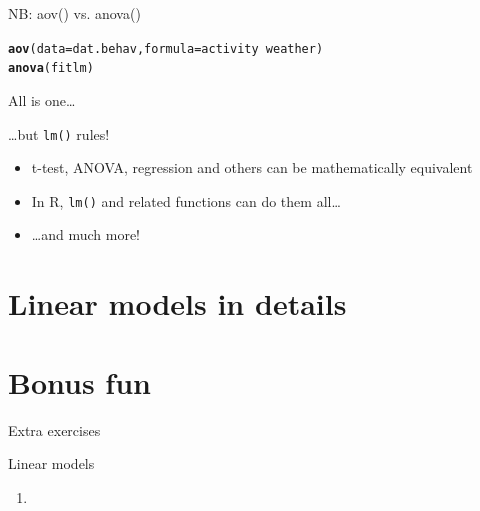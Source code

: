 \documentclass[10pt]{beamer}\usepackage[]{graphicx}\usepackage[]{color}
\makeatletter
\newcommand{\hlopt}[1]{\textcolor[rgb]{0,0,0}{#1}}%
\newcommand{\hlstd}[1]{\textcolor[rgb]{0.345,0.345,0.345}{#1}}%
\newcommand{\hlkwc}[1]{\textcolor[rgb]{0.333,0.667,0.333}{#1}}%
\newcommand{\hlkwd}[1]{\textcolor[rgb]{0.737,0.353,0.396}{\textbf{#1}}}%
\newenvironment{kframe}{%
 \def\at@end@of@kframe{}%
 \ifinner\ifhmode%
  \def\at@end@of@kframe{\end{minipage}}%
  \begin{minipage}{\columnwidth}%
 \fi\fi%
 \def\FrameCommand##1{\hskip\@totalleftmargin \hskip-\fboxsep
 \colorbox{shadecolor}{##1}\hskip-\fboxsep
     \hskip-\linewidth \hskip-\@totalleftmargin \hskip\columnwidth}%
 \MakeFramed {\advance\hsize-\width
   \@totalleftmargin\z@ \linewidth\hsize
   \@setminipage}}%
 {\par\unskip\endMakeFramed%
 \at@end@of@kframe}
\newenvironment{knitrout}{}{} %
\makeatother
\begin{document}
\begin{frame}[fragile]{NB: aov() vs. anova()}

\begin{knitrout}
\color{fgcolor}\begin{kframe}
\begin{alltt}
\hlkwd{aov}\hlstd{(}\hlkwc{data} \hlstd{= dat.behav,} \hlkwc{formula} \hlstd{= activity} \hlopt{~} \hlstd{weather)}
\hlkwd{anova}\hlstd{(fitlm)}
\end{alltt}
\end{kframe}
\end{knitrout}

\end{frame}

\begin{frame}{All is one\dots}
\pause
  \begin{block}{\dots but \texttt{lm()} rules!}
    \begin{itemize}
      \item t-test, ANOVA, regression and others can be mathematically equivalent
      \item In R, \texttt{lm()} and related functions can do them all\dots
      \item \dots and much more!
    \end{itemize}
  \end{block}
\end{frame}

%
%
%
%
%

\section{Linear models in details}
\begin{frame}

\end{frame}

\section{Bonus fun}
\begin{frame}{Extra exercises}

\begin{alertblock}{Linear models}
  \begin{enumerate}
    \item 
  \end{enumerate}
\end{alertblock}
\end{frame}
\end{document}
